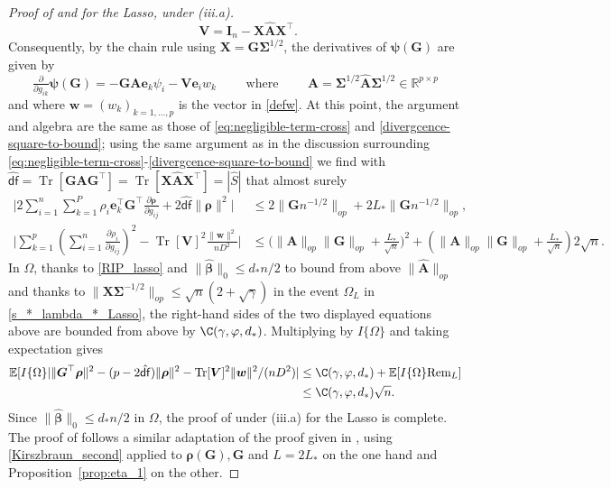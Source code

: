 \documentclass[11pt]{amsart}
\numberwithin{equation}{section}
\numberwithin{equation}{section}
\def\real{{\mathbb{R}}}
\def\R{{\real}}
\def\E{{\mathbb{E}}}
\def\Rem{\hbox{\rm Rem}}
\DeclareMathOperator{\trace}{Tr}
\def\mathbold{\boldsymbol} %
\def\bA{\mathbold{A}}\def\calA{{\cal A}}\def\scrA{{\mathscr A}}\def\Ahat{\widehat{A}}\def\Atil{{\widetilde A}}
\def\hbA{{\widehat{\bA}}}\def\tbA{{\widetilde{\bA}}}
\def\bG{\mathbold{G}}\def\calG{{\cal G}}\def\scrG{{\mathscr G}}\def\Ghat{\widehat{G}}\def\Gtil{{\widetilde G}}
\def\bI{\mathbold{I}}\def\hbI{{\widehat{\bI}}}\def\tbI{{\widetilde{\bI}}}
\def\be{\mathbold{e}}
\def\bV{\mathbold{V}}\def\hbV{{\widehat{\bV}}}\def\tbV{{\widetilde{\bV}}}
\def\bw{\mathbold{w}}\def\what{\widehat{w}}\def\wtil{\widetilde{w}}\def\wbar{{\overline w}}
\def\bX{\mathbold{X}}\def\hbX{{\widehat{\bX}}}\def\tbX{{\widetilde{\bX}}}\def\bXbar{{\overline \bX}}
\def\bbeta{\mathbold{\beta}}\def\betahat{\widehat{\beta}}\def\hbeta{\widehat{\beta}}
\def\hbbeta{{{\widehat{\bbeta}}}}
\def\brho{\mathbold{\rho}}\def\rhohat{\widehat{\rho}}\def\hrho{\widehat{\rho}}
\def\bSigma{\mathbold{\Sigma}}\def\hbSigma{{\widehat{\bSigma}}}
\def\bpsi{\mathbold{\psi}}\def\psihat{\widehat{\psi}}\def\hpsi{\widehat{\psi}}
\def\calG{{\cal G}}
\def\df{{\hat{\mathsf{df}}}{}}
\begin{document}
\begin{proof}[Proof of  and 
    for the Lasso, under (iii.a)]
\begin{equation}
\qquad
\bV = \bI_n - \bX\hbA\bX^\top
.
\end{equation}
Consequently, by the chain rule using $\bX=\bG\bSigma^{1/2}$, the derivatives of $\bpsi(\bG)$ are given by
\begin{equation}
    \tfrac{\partial}{\partial g_{ik}}\bpsi(\bG) 
    =
    - \bG \bA \be_k \psi_i - \bV \be_i w_k
    \qquad \text{ where } \qquad
    \bA = \bSigma^{1/2}\hbA \bSigma^{1/2}\in\R^{p\times p}
\end{equation}
and where $\bw=(w_k)_{k=1,...,p}$ is the vector in \eqref{defw}.
At this point, the argument and algebra are the same as those of
\eqref{eq:negligible-term-cross}
and \eqref{divergcence-square-to-bound}; using the same argument as
in the discussion surrounding \eqref{eq:negligible-term-cross}-\eqref{divergcence-square-to-bound} we find
with 
$\df=\trace[\bG\bA\bG^\top]=\trace[\bX\hbA\bX^\top]=|\hat S|$ that almost surely
\begin{align}
\Big|2 \sum_{i=1}^n\sum_{k=1}^P \rho_i \be_k^\top\bG^\top \frac{\partial \brho}{\partial g_{ij}}
+ 2 \df\|\brho\|^2
\Big|
&\le 2 \|\bG n^{-1/2}\|_{op} + 2L_* \|\bG n^{-1/2}\|_{op},
\nonumber
\\
\Big|
\sum_{k=1}^p(\sum_{i=1}^n\frac{\partial \rho_i}{\partial g_{ij}})^2
- \trace[\bV]^2 \frac{\|\bw\|^2}{nD^2}
\Big|
&\le
\bigl(\|\bA\|_{op}\|\bG\|_{op} + \frac{L_*}{\sqrt n}\bigr)^2
+ (\|\bA\|_{op}\|\bG\|_{op} + \frac{L_*}{\sqrt n}) 2 \sqrt n.
\label{eq:two-lines_lasso-bounds}
\end{align}
In $\Omega$, thanks to \eqref{RIP_lasso} and $\|\hbbeta\|_0\le d_*n/2$
to bound from above $\|\hbA\|_{op}$ and thanks to
$\|\bX\bSigma^{-1/2}\|_{op}\le\sqrt n (2+\sqrt \gamma)$
in the event $\Omega_L$ in \eqref{s_*_lambda_*_Lasso},
the right-hand sides of the two displayed equations above
are bounded from above by $\C(\gamma,\varphi,d_*)$.
Multiplying by $I\{\Omega\}$ and taking expectation gives
\begin{align}
\E[I\{\Omega\}
|\|\bG^\top\brho\|^2 - (p-2\df)\|\brho\|^2 - \trace[\bV]^2\|\bw\|^2/(nD^2)
|
&\le
\C(\gamma,\varphi,d_*) +
\E[I\{\Omega\}\Rem_L]
\nonumber
\\&\le \C(\gamma,\varphi,d_*) \sqrt n.
\label{eq:final_lasso}
\end{align}
Since $\|\hbbeta\|_0\le d_*n/2$ in $\Omega$, the proof of
 under (iii.a) for the Lasso
is complete.
The proof of  follows a similar adaptation
of the proof given in , using
\eqref{Kirszbraun_second} applied to $\brho(\bG),\bG$ and $L=2L_*$
on the one hand
and Proposition~\ref{prop:eta_1} on the other.
\end{proof}
\end{document}
